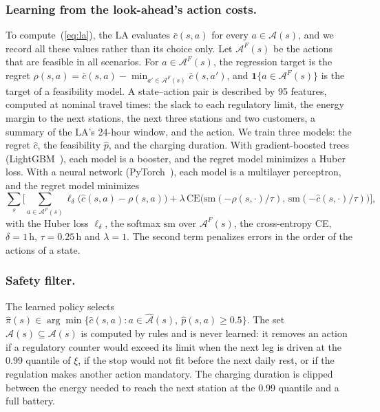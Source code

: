 \documentclass[runningheads]{llncs}
\begin{document}
\subsubsection{Learning from the look-ahead's action costs.}
To compute~(\ref{eq:la}), the LA evaluates $\bar c(s,a)$ for every
$a\in\mathcal{A}(s)$, and we record all these values rather than its choice
only. Let $\mathcal{A}^F(s)$ be the actions that are feasible in all scenarios.
For $a\in\mathcal{A}^F(s)$, the regression target is the regret
$\rho(s,a)=\bar c(s,a)-\min_{a'\in\mathcal{A}^F(s)}\bar c(s,a')$, and
$\mathbf{1}\{a\in\mathcal{A}^F(s)\}$ is the target of a feasibility model. A
state--action pair is described by 95 features, computed at nominal travel
times: the slack to each regulatory limit, the energy margin to the next
stations, the next three stations and two customers, a summary of the LA's
24-hour window, and the action. We train three models: the regret $\hat c$,
the feasibility $\hat p$, and the charging duration. With gradient-boosted
trees (LightGBM~\cite{ke2017}), each model is a booster, and the regret model
minimizes a Huber loss. With a neural network (PyTorch~\cite{paszke2019}),
each model is a multilayer perceptron, and the regret model minimizes
\begin{equation}
\sum_{s}\Big[\sum_{a\in\mathcal{A}^F(s)}
\ell_\delta\big(\hat c(s,a)-\rho(s,a)\big)
+\lambda\,\mathrm{CE}\big(\mathrm{sm}(-\rho(s,\cdot)/\tau),\,
\mathrm{sm}(-\hat c(s,\cdot)/\tau)\big)\Big],
\label{eq:loss}
\end{equation}
with the Huber loss $\ell_\delta$, the softmax $\mathrm{sm}$ over
$\mathcal{A}^F(s)$, the cross-entropy CE, $\delta=1$\,h, $\tau=0.25$\,h and
$\lambda=1$. The second term penalizes errors in the order of the actions of a
state.

\subsubsection{Safety filter.}
The learned policy selects
$\hat\pi(s)\in\arg\min\{\hat c(s,a): a\in\hat{\mathcal{A}}(s),\
\hat p(s,a)\ge0.5\}$. The set $\hat{\mathcal{A}}(s)\subseteq\mathcal{A}(s)$ is
computed by rules and is never learned: it removes an action if a regulatory
counter would exceed its limit when the next leg is driven at the 0.99
quantile of $\xi$, if the stop would not fit before the next daily rest, or if
the regulation makes another action mandatory. The charging duration is
clipped between the energy needed to reach the next station at the 0.99
quantile and a full battery.
\end{document}
